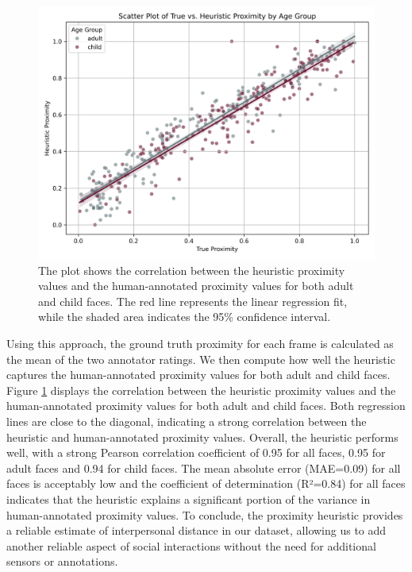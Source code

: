 \documentclass[
  man,floatsintext]{apa6}
\begin{document}
\begin{figure}

{\centering \includegraphics[width=450px]{images/proximity_eval_plot} 

}

\caption{The plot shows the correlation between the heuristic proximity values and the human-annotated proximity values for both adult and child faces. The red line represents the linear regression fit, while the shaded area indicates the 95\% confidence interval.}\label{fig:proximity-plot}
\end{figure}

Using this approach, the ground truth proximity for each frame is calculated as the mean of the two annotator ratings. We then compute how well the heuristic captures the human-annotated proximity values for both adult and child faces. Figure \ref{fig:proximity-plot} displays the correlation between the heuristic proximity values and the human-annotated proximity values for both adult and child faces. Both regression lines are close to the diagonal, indicating a strong correlation between the heuristic and human-annotated proximity values. Overall, the heuristic performs well, with a strong Pearson correlation coefficient of 0.95 for all faces, 0.95 for adult faces and 0.94 for child faces. The mean absolute error (MAE=0.09) for all faces is acceptably low and the coefficient of determination (R²=0.84) for all faces indicates that the heuristic explains a significant portion of the variance in human-annotated proximity values.
To conclude, the proximity heuristic provides a reliable estimate of interpersonal distance in our dataset, allowing us to add another reliable aspect of social interactions without the need for additional sensors or annotations.
\end{document}
